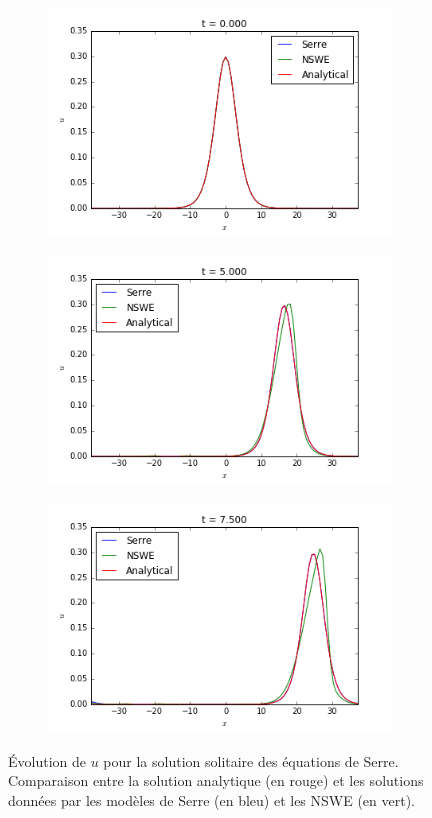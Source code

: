 \begin{figure}[h!]
	\begin{subfigure}{.3\linewidth}
		\includegraphics[scale=.3]{figures/Serre/4x4solitary1u.png}	
	\end{subfigure}
	\begin{subfigure}{.3\linewidth}
		\includegraphics[scale=.3]{figures/Serre/4x4solitary2u.png}	
	\end{subfigure}
	\begin{subfigure}{.3\linewidth}
		\includegraphics[scale=.3]{figures/Serre/4x4solitary3u.png}	
	\end{subfigure}
	\caption{Évolution de $u$ pour la solution solitaire des équations de Serre. Comparaison entre la solution analytique (en rouge) et les solutions données par les modèles de Serre (en bleu) et les NSWE (en vert).  \label{fig:solitaryu}}
\end{figure}

